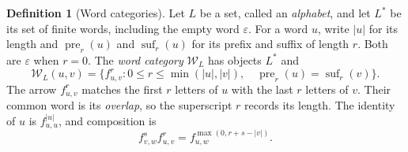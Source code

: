 \documentclass[11pt,a4paper]{article}
\theoremstyle{plain}
\theoremstyle{definition}
\newtheorem{definition}[theorem]{Definition}
\theoremstyle{remark}
\begin{document}
\begin{definition}[Word categories]\label{def:wordcategory}
Let $L$ be a set, called an \emph{alphabet}, and let $L^*$ be its set
of finite words, including the empty word $\varepsilon$.
For a word $u$, write $|u|$ for its length and
$\operatorname{pre}_r(u)$ and $\operatorname{suf}_r(u)$ for its
prefix and suffix of length $r$. Both are $\varepsilon$ when $r=0$.
The \emph{word category} $\mathcal W_L$ has objects $L^*$ and
\begin{equation}\label{eq:wordhom}
 \mathcal W_L(u,v)=
 \{f^r_{u,v}:0\le r\le\min(|u|,|v|),\quad
          \operatorname{pre}_r(u)=\operatorname{suf}_r(v)\}.
\end{equation}
The arrow $f^r_{u,v}$ matches the first $r$ letters of $u$ with
the last $r$ letters of $v$. Their common word is its
\emph{overlap}, so the superscript $r$ records its length. The identity
of $u$ is $f^{|u|}_{u,u}$, and composition is
\begin{equation}\label{eq:wordcomposition}
f^s_{v,w}f^r_{u,v}
   =f^{\max(0,r+s-|v|)}_{u,w}.
\end{equation}
\end{definition}
\end{document}
